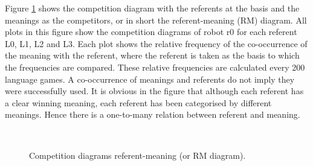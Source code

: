 Figure \ref{f:st:compRC} shows the competition diagram with the referents at the basis and the meanings as the competitors, or in short the referent-meaning (RM) diagram. All plots in this figure show the competition diagrams of robot r0 for each referent L0, L1, L2 and L3. Each plot shows the relative frequency of the co-occurrence of the meaning with the referent, where the referent is taken as the basis to which the frequencies are compared. These relative frequencies are calculated every 200 language games. A co-occurrence of meanings and referents do not imply they were successfully used. It is obvious in the figure that although each referent has a clear winning meaning, each referent has been categorised by different meanings. Hence there is a one-to-many relation between referent and meaning.

\begin{figure}[t]
\centering
{}
\\
\caption{Competition diagrams referent-meaning (or RM diagram).}
\label{f:st:compRC}
\end{figure}


